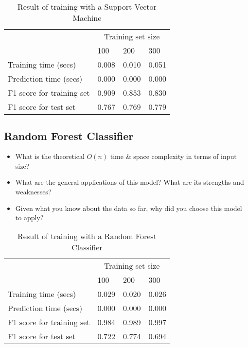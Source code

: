 \documentclass[12pt]{article}
\begin{document}
\setlength{\extrarowheight}{1.5pt}
\begin{table}[!htbp]
\caption{Result of training with a Support Vector Machine} %
\centering %
\begin{tabular}{|p{6cm}|p{1.5cm}|p{1.5cm}|p{1.5cm}|} %
\hline %
& \multicolumn{3}{c|}{Training set size}\\[5pt]
\cline{2-4} 
& 100 & 200 & 300\\[0.5ex]
\hline %

Training time (secs)   &       0.008 & 0.010 & 0.051 \\
Prediction time (secs)   &     0.000 & 0.000 & 0.000 \\
F1 score for training set  &   0.909 & 0.853 & 0.830 \\
F1 score for test set    &     0.767 & 0.769 & 0.779 \\
\hline %
\end{tabular}
\label{svmTable}
\end{table}


\subsection*{Random Forest Classifier}
\begin{itemize} [noitemsep,nolistsep]
\item What is the theoretical $O(n)$ time \& space complexity in terms of input size?
\item What are the general applications of this model? What are its strengths and weaknesses?
\item Given what you know about the data so far, why did you choose this model to apply?
\end{itemize} 


\setlength{\extrarowheight}{1.5pt}
\begin{table}[!htbp]
\caption{Result of training with a Random Forest Classifier} %
\centering %
\begin{tabular}{|p{6cm}|p{1.5cm}|p{1.5cm}|p{1.5cm}|} %
\hline %
& \multicolumn{3}{c|}{Training set size}\\[5pt]
\cline{2-4} 
& 100 & 200 & 300\\[0.5ex]
\hline %

Training time (secs)   &       0.029 & 0.020 & 0.026 \\
Prediction time (secs)   &     0.000 & 0.000 & 0.000 \\
F1 score for training set  &   0.984 & 0.989 & 0.997 \\
F1 score for test set    &     0.722 & 0.774 & 0.694 \\
\hline %
\end{tabular}
\label{randomForestClassifierTable}
\end{table}
\end{document}
